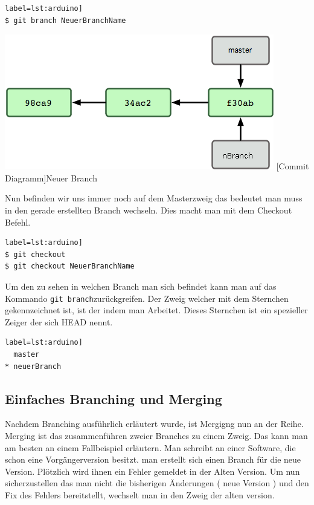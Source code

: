 \documentclass[12pt,a4paper,bibliography=totocnumbered,listof=totocnumbered]{scrartcl}
\begin{document}
\begin{lstlisting}[caption=Branch Befehl] label=lst:arduino]
$ git branch NeuerBranchName
\end{lstlisting}
\newline
\vspace{2em}
\begin{minipage}{\linewidth}
	\centering
	\includegraphics[width=0.6\linewidth]{Bilder/nbranch.png}
	[Commit Diagramm]{Neuer Branch\footnotemark }
	\label{fig:gitspeichern}
\end{minipage}
Nun befinden wir uns immer noch auf dem Masterzweig das bedeutet man muss in den gerade erstellten Branch wechseln.
Dies macht man mit dem Checkout Befehl.
\begin{lstlisting}[caption=Branch Befehl] label=lst:arduino]
$ git checkout 
$ git checkout NeuerBranchName
\end{lstlisting}
Um den zu sehen in welchen Branch man sich befindet kann man auf das Kommando \lstinline|git branch|zurückgreifen. Der Zweig welcher mit dem Sternchen gekennzeichnet ist, ist der indem man Arbeitet. Dieses Sternchen ist ein spezieller Zeiger der sich HEAD nennt. 
\begin{lstlisting}[caption=Aktuellen Branch prüfen] label=lst:arduino]
  master
* neuerBranch
\end{lstlisting}


	
\subsection{Einfaches Branching und Merging}
Nachdem Branching ausführlich erläutert wurde, ist Mergigng  nun an der Reihe. Merging ist das zusammenführen zweier Branches zu einem Zweig.
Das kann man am besten an einem Fallbeispiel erläutern. 
Man schreibt an einer Software, die schon eine Vorgängerversion besitzt. 
man erstellt sich einen Branch für die neue Version. 
Plötzlich wird ihnen ein Fehler gemeldet in der Alten Version. Um nun sicherzustellen das man nicht die bisherigen Änderungen ( neue Version ) und den Fix des Fehlers bereitstellt, wechselt man in den Zweig der alten version. 
\end{document}
